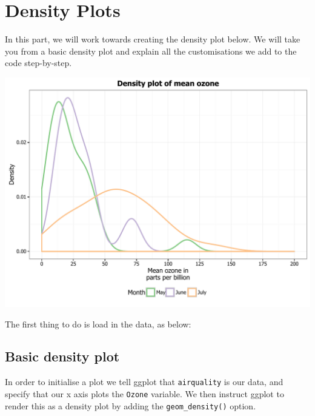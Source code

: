 \chapter{Density Plots}\label{density-plots}

In this part, we will work towards creating the density plot below. We
will take you from a basic density plot and explain all the
customisations we add to the code step-by-step.

\begin{center}\includegraphics[width=0.55\linewidth]{figures/density_final-1} \end{center}

The first thing to do is load in the data, as below:

\begin{Shaded}
\begin{Highlighting}[]
\NormalTok{(} \NormalTok{())}

\end{Highlighting}
\end{Shaded}

\section{Basic density plot}\label{basic-density-plot}

In order to initialise a plot we tell ggplot that \texttt{airquality} is
our data, and specify that our x axis plots the \texttt{Ozone} variable.
We then instruct ggplot to render this as a density plot by adding the
\texttt{geom\_density()} option.

\begin{Shaded}
\begin{Highlighting}[]
\StringTok{ }\NormalTok{(} \StringTok{ }\NormalTok{()}
\end{Highlighting}
\end{Shaded}

